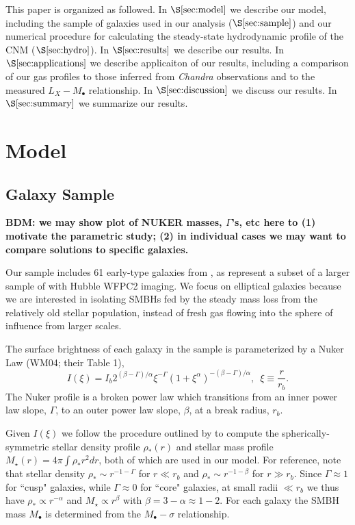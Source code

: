 \documentclass[usenatbib,fleqn]{mn2e}
\newcommand{\rb}{r_b}
\newcommand{\rhostar}{\rho_*}
\newcommand{\Mbh}[1][]{M_{\bullet#1}}
\begin{document}
This paper is organized as followed.  In $\S\ref{sec:model}$ we
describe our model, including the sample of galaxies used in our
analysis ($\S\ref{sec:sample}$) and our numerical procedure for
calculating the steady-state hydrodynamic profile of the CNM
($\S\ref{sec:hydro}$).  In $\S\ref{sec:results}$ we describe our
results.  In $\S\ref{sec:applications}$ we describe applicaiton of our
results, including a comparison of our gas profiles to those inferred
from {\it Chandra} observations and to the measured $L_X-\Mbh$
relationship.  In $\S\ref{sec:discussion}$ we discuss our results.  In
$\S\ref{sec:summary}$ we summarize our results.
\section{Model}
\label{sec:model}

\subsection{Galaxy Sample}

\label{sec:sample}
{\bf BDM: we may show plot of NUKER masses, $\Gamma$'s, etc here to (1) motivate the parametric study; (2) in individual cases we may want to compare solutions to specific galaxies.}

Our sample includes 61 early-type galaxies from
, as represent a subset of a larger
sample of \citet{FaberTremaine+:1997a} with Hubble WFPC2 imaging.  We
focus on elliptical galaxies because we are interested in isolating
SMBHs fed by the steady mass loss from the relatively old stellar
population, instead of fresh gas flowing into the sphere of influence
from larger scales.

The surface brightness of each galaxy in the sample is parameterized by a Nuker Law (WM04; their Table 1),
\begin{equation}
  I(\xi)=I_b 2^{(\beta-\Gamma)/\alpha} \xi^{-\Gamma} (1+\xi^\alpha)^{-(\beta-\Gamma)/\alpha}, \,\,\,\xi\equiv\frac{r}{r_b}.
\end{equation}
The Nuker profile is a broken power law which transitions from an inner power law slope, $\Gamma$, to an outer power law slope, $\beta$, at a break radius, $\rb$.  

Given $I(\xi)$ we follow the procedure outlined by
 to compute the spherically-symmetric
stellar density profile $\rhostar(r)$ and stellar mass profile
$M_{\star}(r) = 4\pi \int \rhostar r^{2}dr$, both of which are used in
our model.  For reference, note that stellar density $\rhostar\sim
r^{-1-\Gamma}$ for $r \ll \rb$ and $\rhostar\sim r^{-1-\beta}$ for $r
\gg \rb$.  Since $\Gamma\approx 1$ for ``cusp" galaxies, while
$\Gamma\approx 0$ for ``core" galaxies, at small radii $\ll \rb$ we
thus have $\rhostar \propto r^{-\alpha}$ and $M_{\star} \propto
r^{\beta}$ with $\beta = 3-\alpha \approx 1-2$.  For each galaxy the
SMBH mass $\Mbh$ is determined from the $\Mbh-\sigma$ relationship.
\end{document}
